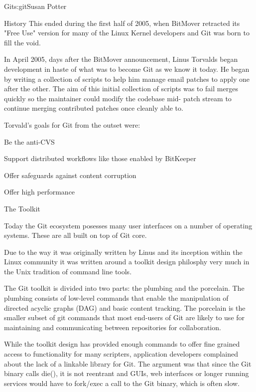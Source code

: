 \begin{aosachapter}{Git}{s:git}{Susan Potter}
\begin{aosasect1}{History}
This ended during the first half of 2005, when BitMover retracted its
"Free Use" version for many of the Linux Kernel developers and Git was born
to fill the void.

In April 2005, days after the BitMover announcement, Linus Torvalds began
development in haste of what was to become Git as we know it today. He began
by writing a collection of scripts to help him manage email patches
to apply one after the other. The aim of this initial collection of scripts
was to fail merges quickly so the maintainer could modify the codebase mid-
patch stream to continue merging contributed patches once cleanly able to.

Torvald's goals for Git from the outset were:
\begin{aosaitemize}
  \item Be the anti-CVS
  \item Support distributed workflows like those enabled by BitKeeper
  \item Offer safeguards against content corruption
  \item Offer high performance
\end{aosaitemize}

\end{aosasect1}

\begin{aosasect1}{The Toolkit}

Today the Git ecosystem posesses many user interfaces on a number of operating
systems. These are all built on top of Git core.

Due to the way it was originally written by Linus and its inception within
the Linux community it was written around a toolkit design philosphy very
much in the Unix tradition of command line tools.

The Git toolkit is divided into two parts: the plumbing and
the porcelain. The plumbing consists of low-level commands that enable
the manipulation of directed acyclic graphs (DAG) and basic content
tracking. The porcelain is the smaller subset of git commands that most
end-users of Git are likely to use for maintaining and communicating between
repositories for collaboration.

While the toolkit design has provided enough commands to offer
fine grained access to functionality for many scripters, application developers
complained about the lack of a linkable library for Git. The argument was
that since the Git binary calls die(), it is not reentrant and GUIs, web
interfaces or longer running services would have to fork/exec a call to the
Git binary, which is often slow.


\end{aosasect1}
\end{aosachapter}
